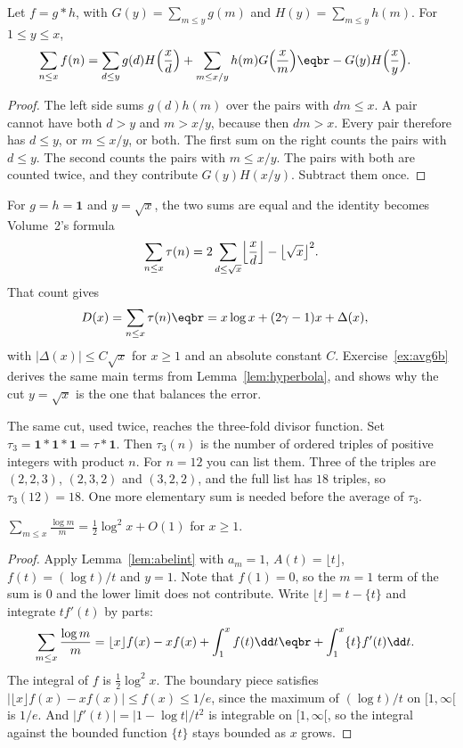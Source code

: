 \begin{lemma}\label{lem:hyperbola}
Let $f=g*h$, with $G(y)=\sum_{m\le y}g(m)$ and $H(y)=\sum_{m\le y}h(m)$. For $1\le y\le x$,
\[
\begin{aligned}\sum_{n\le x}f(n)&=\sum_{d\le y}g(d)H\Bigl(\frac xd\Bigr)+\sum_{m\le x/y}h(m)G\Bigl(\frac xm\Bigr)\eqbr-G(y)H\Bigl(\frac xy\Bigr).\end{aligned}
\]
\end{lemma}
\begin{proof}
The left side sums $g(d)h(m)$ over the pairs with $dm\le x$. A pair cannot have both $d>y$ and $m>x/y$, because then $dm>x$. Every pair therefore has $d\le y$, or $m\le x/y$, or both. The first sum on the right counts the pairs with $d\le y$. The second counts the pairs with $m\le x/y$. The pairs with both are counted twice, and they contribute $G(y)H(x/y)$. Subtract them once.
\end{proof}

For $g=h=\mathbf1$ and $y=\sqrt x$, the two sums are equal and the identity becomes Volume~2's formula
\[
\sum_{n\le x}\tau(n)=2\sum_{d\le\sqrt x}\Bigl\lfloor\frac xd\Bigr\rfloor-\bigl\lfloor\sqrt x\bigr\rfloor^2.
\]
That count gives
\[
\begin{aligned}D(x)&=\sum_{n\le x}\tau(n)\eqbr=x\log x+(2\gamma-1)x+\Delta(x),\end{aligned}
\]
with $|\Delta(x)|\le C\sqrt x$ for $x\ge1$ and an absolute constant $C$. Exercise~\ref{ex:avg6b} derives the same main terms from Lemma~\ref{lem:hyperbola}, and shows why the cut $y=\sqrt x$ is the one that balances the error.

The same cut, used twice, reaches the three-fold divisor function. Set $\tau_3=\mathbf1*\mathbf1*\mathbf1=\tau*\mathbf1$. Then $\tau_3(n)$ is the number of ordered triples of positive integers with product $n$. For $n=12$ you can list them. Three of the triples are $(2,2,3)$, $(2,3,2)$ and $(3,2,2)$, and the full list has $18$ triples, so $\tau_3(12)=18$. One more elementary sum is needed before the average of $\tau_3$.

\begin{lemma}\label{lem:logsum}
$\displaystyle\sum_{m\le x}\frac{\log m}m=\frac12\log^2x+O(1)$ for $x\ge1$.
\end{lemma}
\begin{proof}
Apply Lemma~\ref{lem:abelint} with $a_m=1$, $A(t)=\lfloor t\rfloor$, $f(t)=(\log t)/t$ and $y=1$. Note that $f(1)=0$, so the $m=1$ term of the sum is $0$ and the lower limit does not contribute. Write $\lfloor t\rfloor=t-\{t\}$ and integrate $t f'(t)$ by parts:
\[
\begin{aligned}\sum_{m\le x}\frac{\log m}m&=\lfloor x\rfloor f(x)-xf(x)+\int_1^xf(t)\dd t\eqbr+\int_1^x\{t\}f'(t)\dd t.\end{aligned}
\]
The integral of $f$ is $\frac12\log^2 x$. The boundary piece satisfies $|\lfloor x\rfloor f(x)-xf(x)|\le f(x)\le1/e$, since the maximum of $(\log t)/t$ on $[1,\infty[$ is $1/e$. And $|f'(t)|=|1-\log t|/t^2$ is integrable on $[1,\infty[$, so the integral against the bounded function $\{t\}$ stays bounded as $x$ grows.
\end{proof}

